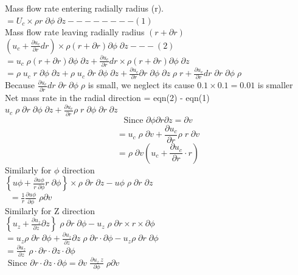 \documentclass[a4paper, 12pt]{report}
\begin{document}
Mass flow rate entering radially radius (r).
$= U_c \times \rho r \; \partial\phi \;\partial z -------- (1)$\\
Mass flow rate leaving radially radius $(r+\partial r)$\\
$\displaystyle \left(u_c + \frac{\partial u_c}{\partial r}dr\right) \times \rho(r+\partial r) \partial \phi \;\partial z ---(2)$\\

$\displaystyle = u_c \;\rho(r + \partial r)\partial \phi \;\partial z + \frac{\partial u_c}{\partial r}dr \times \rho(r + \partial r)\partial\phi \;\partial z$\\

$\displaystyle = \rho \;u_c \;r\; \partial\phi\;\partial z + \rho \;u_c \;\partial r \;\partial \phi\; \partial z + \frac{\partial u_c}{\partial r}\partial r\; \partial\phi\; \partial z \; \rho\; r + \frac{\partial u_c}{\partial r}dr\;\partial r \;\partial\phi \;\rho $\\
Because $\displaystyle \frac{\partial u_c}{\partial r} dr \;\partial r \;\partial\phi \;\rho$ is small, we neglect its cause $0.1 \times 0.1 = 0.01$ is smaller\\
Net mass rate in the radial direction = eqn(2) - eqn(1)\\
$\displaystyle u_c \;\rho \;\partial r \;\partial \phi \;\partial z + \frac{\partial u_c}{\partial r} \rho\; r \;\partial\phi\; \partial r \;\partial z$\\
$$
	\text{Since }\partial \phi \partial r \partial z = \partial v
$$
$$
	= u_c\;\rho \;\partial v + \frac{\partial u_c}{\partial r}\rho\; r\;\partial v$$
$$
	= \rho\; \partial v \left(u_c + \frac{\partial u_c}{\partial r} \cdot r\right)
$$
Similarly for $\phi$ direction\\
$\displaystyle \left\{u\phi + \frac{\partial u\phi}{r\;\partial \phi}r \; \partial \phi \right\} \times \rho \; \partial r \; \partial z - u\phi\; \rho \; \partial r\; \partial z $\\[0.2cm]
$\displaystyle \left.\right. \;\; = \frac{1}{r} \frac{\partial u\phi}{\partial\phi}\; \rho \partial v $ \\[0.1cm]
Similarly for Z direction\\
$\displaystyle \left\{u_z + \frac{\partial u_z}{\partial z}\partial z\right\}\; \rho\ \partial r \; \partial \phi - u_z \; \rho\; \partial r \times r \times \partial \phi $\\[0.2cm]
$\displaystyle = u_z \rho \; \partial r \; \partial \phi + \frac{\partial u_z}{\partial z}\partial z \; \rho\;\partial r \cdot \partial \phi - u_z \rho \; \partial r \; \partial \phi $\\[0.3cm]
$\displaystyle = \frac{\partial u_z}{\partial z}\; \rho\cdot \partial r \cdot \partial z \cdot \partial \phi$\\[0.3cm]
$
 \text{ Since } \partial r \cdot \partial z \cdot \partial \phi = \partial v
 $
 $\displaystyle \frac{\partial u_z\ z}{\partial\phi}\; \rho \partial v $
\end{document}
